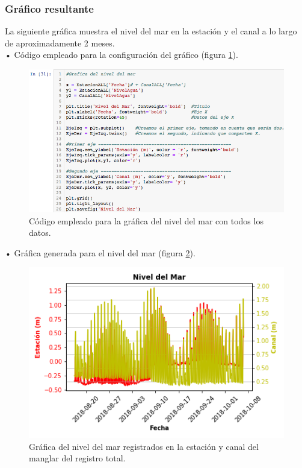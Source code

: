 \documentclass[12pt]{article}
\begin{document}
\subsubsection{Gráfico resultante}

\noindent La siguiente gráfica muestra el nivel del mar en la estación y el canal a lo largo de aproximadamente 2 meses. \\

\noindent • Código empleado para la configuración del gráfico (figura \ref{fig:cod-nivel-total}). \\

\begin{figure}[h!]
	\center
	\includegraphics[scale=.6]{./Images/nivel-doble}
	\caption{\label{fig:cod-nivel-total} Código empleado para la gráfica del nivel del mar con todos los datos.}
\end{figure}

\noindent • Gráfica generada para el nivel del mar (figura \ref{fig:graf-nivel-total}).

\begin{figure}[h!]
	\center
	\includegraphics[scale=.6]{Nivel-del-Mar}
	\caption{\label{fig:graf-nivel-total} Gráfica del nivel del mar registrados en la estación y canal del manglar del registro total.}
\end{figure}
\end{document}
